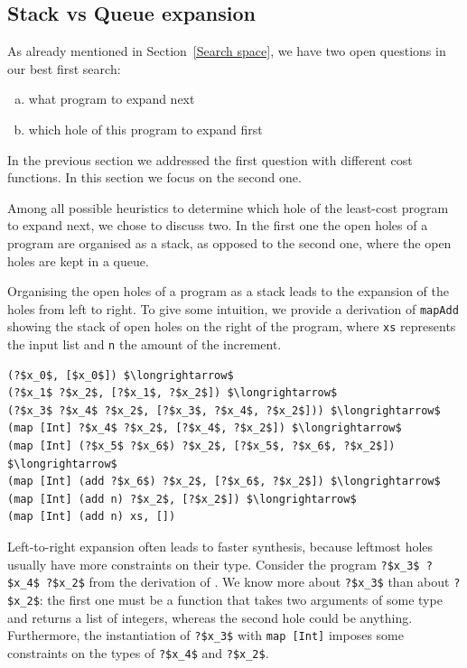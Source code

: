 \subsection{Stack vs Queue expansion}
As already mentioned in Section~\ref{Search space}, we have two open questions in our best first search:
\begin{enumerate}[a.]
\item what program to expand next
\item which hole of this program to expand first
\end{enumerate}
In the previous section we addressed the first question with different cost functions. In this section we focus on the second one.

Among all possible heuristics to determine which hole of the least-cost program to expand next, we chose to discuss two. In the first one the open holes of a program are organised as a stack, as opposed to the second one, where the open holes are kept in a queue.

Organising the open holes of a program as a stack leads to the expansion of the holes from left to right. To give some intuition, we provide a derivation of \lstinline?mapAdd? showing the stack of open holes on the right of the program, where \lstinline?xs? represents the input list and \lstinline?n? the amount of the increment.
\begin{lstlisting}[style=plain]
(?$x_0$, [$x_0$]) $\longrightarrow$
(?$x_1$ ?$x_2$, [?$x_1$, ?$x_2$]) $\longrightarrow$
(?$x_3$ ?$x_4$ ?$x_2$, [?$x_3$, ?$x_4$, ?$x_2$])) $\longrightarrow$
(map [Int] ?$x_4$ ?$x_2$, [?$x_4$, ?$x_2$]) $\longrightarrow$
(map [Int] (?$x_5$ ?$x_6$) ?$x_2$, [?$x_5$, ?$x_6$, ?$x_2$]) $\longrightarrow$
(map [Int] (add ?$x_6$) ?$x_2$, [?$x_6$, ?$x_2$]) $\longrightarrow$
(map [Int] (add n) ?$x_2$, [?$x_2$]) $\longrightarrow$
(map [Int] (add n) xs, [])
\end{lstlisting}
Left-to-right expansion often leads to faster synthesis, because leftmost holes usually have more constraints on their type. Consider the program \lstinline!?$x_3$ ?$x_4$ ?$x_2$! from the derivation of \lstinline??. We know more about \lstinline!?$x_3$! than about \lstinline!?$x_2$!: the first one must be a function that takes two arguments of some type and returns a list of integers, whereas the second hole could be anything. Furthermore, the instantiation of \lstinline!?$x_3$! with \lstinline?map [Int]? imposes some constraints on the types of \lstinline!?$x_4$! and \lstinline!?$x_2$!.

